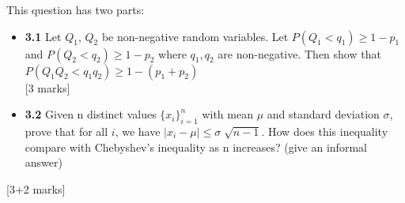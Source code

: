 \begin{que}
	This question has two parts:
	\begin{itemize}
		\item \textbf{3.1} Let $Q_{1}$, $Q_{2}$ be non-negative random
		      variables. Let $P(Q_1 < q_1) \geq 1-p_1$ and $P(Q_2 < q_2)
			      \geq 1-p_2$ where $q_1, q_2$ are non-negative. Then show
		      that $P(Q_1Q_2 < q_1q_2) \geq 1 - (p_1 + p_2)$\\
		      \hspace*{\fill} [3 marks]
		\item \textbf{3.2} Given n distinct values ${\{x_i\}}^n_{i=1}$
		      with mean $\mu$ and standard deviation $\sigma$, prove that
		      for all $i$, we have $|x_i - \mu| \leq \sigma
			      \sqrt[]{n-1}$. How does this inequality compare with
		      Chebyshev's inequality as n increases? (give an informal
		      answer)
	\end{itemize}
	\hspace*{\fill} [3+2 marks]
\end{que}

